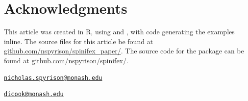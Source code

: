 \hypertarget{acknowledgments}{%
\section{Acknowledgments}\label{acknowledgments}}

This article was created in R, using 
\citep{xie_knitr_2020} and 
\citep{allaire_rmarkdown_2020}, with code generating the examples
inline. The source files for this article be found at
\href{https://github.com/nspyrison/spinifex_paper/}{github.com/nspyrison/spinifex\_paper/}.
The source code for the  package can be found at
\href{https://github.com/nspyrison/spinifex/}{github.com/nspyrison/spinifex/}.



\address{%
Nicholas Spyrison\\
Monash University\\
Faculty of Information Technology\\
}
\href{mailto:nicholas.spyrison@monash.edu}{\nolinkurl{nicholas.spyrison@monash.edu}}

\address{%
Dianne Cook\\
Monash University\\
Department of Econometrics and Business Statistics\\
}
\href{mailto:dicook@monash.edu}{\nolinkurl{dicook@monash.edu}}

